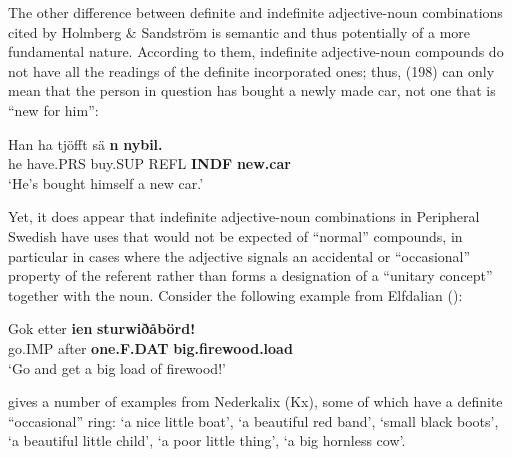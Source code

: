 
The other difference between definite and indefinite adjective-noun combinations cited by Holmberg \& Sandström is semantic and thus potentially of a more fundamental nature. According to them, indefinite adjective-noun compounds do not have all the readings of the definite incorporated ones; thus, (198) can only mean that the person in question has bought a newly made car, not one that is “new for him”:


\ea\label{}
\gll Han  ha  tjöfft  sä  \textbf{n}\textbf{  nybil.}\\
he  have.PRS  buy.SUP  REFL  \textbf{INDF} \textbf{new.car}\\
\glt ‘He’s bought himself a new car.’
\z

Yet, it does appear that indefinite adjective-noun combinations in Peripheral Swedish have uses that would not be expected of “normal” compounds, in particular in cases where the adjective signals an accidental or “occasional” property of the referent rather than forms a designation of a “unitary concept” together with the noun. Consider the following example from Elfdalian (\citet[142]{Levander1909}):


\ea\label{}
\gll Gok  etter  \textbf{ien} \textbf{sturwiðåbörd!}\\
go.IMP  after  \textbf{one.F.DAT} \textbf{big.firewood.load}\\
\glt ‘Go and get a big load of firewood!’ 
\z

\citet[141]{Rutberg1924} gives a number of examples from Nederkalix (Kx), some of which have a definite “occasional” ring: ‘a nice little boat’,  ‘a beautiful red band’,  ‘small black boots’,  ‘a beautiful little child’,  ‘a poor little thing’,  ‘a big hornless cow’.

